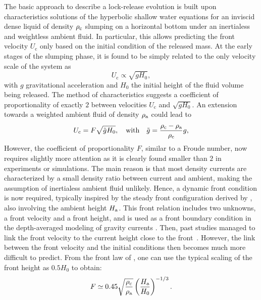 \documentclass[12pt]{article}
\begin{document}
The basic approach to describe a lock-release evolution is built upon characteristics solutions of the hyperbolic shallow water equations for an inviscid dense liquid of density $\rho_{\text c}$ slumping on a horizontal bottom under an inertialess and weightless ambient fluid. In particular, this allows predicting the front velocity $U_{\text{c}}$ only based on the initial condition of the released mass. At the early stages of the slumping phase, it is found to be simply related to the only velocity scale of the system as
\begin{equation}
	U_{\text{c}}\propto \sqrt{gH_0},
\end{equation}
with $g$ gravitational acceleration and $H_0$ the initial height of the fluid volume being released. The method of characteristics suggests a coefficient of proportionality of exactly $2$ between velocities $U_{\text{c}}$ and $\sqrt{g H_0}$. An extension towards a weighted ambient fluid of density $\rho_{\text a}$ could lead to
\begin{equation}
	\label{eq:solUc}
	U_{\text{c}}=F\sqrt{\tilde{g}H_0},\quad\mbox{with}\quad \tilde{g}=\frac{\rho_{\text c}-\rho_{\text a}}{\rho_{\text c}}g,
\end{equation}
However, the coefficient of proportionality $F$, similar to a Froude number, now requires slightly more attention as it is clearly found smaller than $2$ in experiments or simulations. The main reason is that most density currents are characterized by a small density ratio between current and ambient, making the assumption of inertialess ambient fluid unlikely. 
%
Hence, a dynamic front condition is now required, typically inspired by the steady front configuration derived by \citet{Benjamin1968}, also involving the ambient height $H_{\text a}$. This front relation includes two unknowns, a front velocity and a front height, and is used as a front boundary condition in the depth-averaged modeling of gravity currents \cite[e.g.][]{ungarish2020gravity}. Then, past studies managed to link the front velocity to the current height close to the front~\citep[e.g.][]{Benjamin1968, Huppert1980, Rottman1983, Ungarish2005}. However, the link between the front velocity and the initial conditions then becomes much more difficult to predict. From the front law of \citet{Huppert1980}, one can use the typical scaling of the front height as $0.5 H_{0}$ to obtain:
\begin{equation}
	\label{eq:Froude_Huppert1980}
	F \simeq 0.45 \sqrt{\frac{\rho_{\text c}}{\rho_{\text a}}}\left(\frac{H_{\text a}}{H_0}\right)^{-1/3}.
\end{equation}
\end{document}
